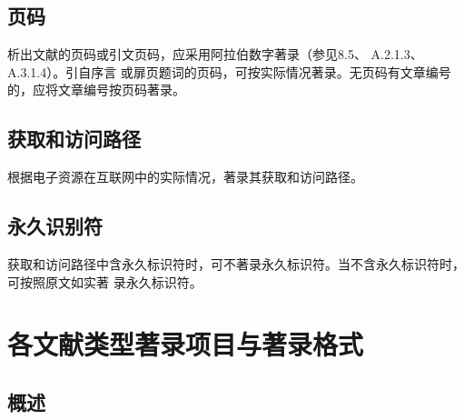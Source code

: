 \documentclass{article}
\begin{document}
\subsection{页码}
析出文献的页码或引文页码，应采用阿拉伯数字著录（参见8.5、 A.2.1.3、 A.3.1.4）。引自序言
或扉页题词的页码，可按实际情况著录。无页码有文章编号的，应将文章编号按页码著录。

\begin{refsection}
\nocite{曹凌2011-19-}
\nocite{钱学森2001--}
\nocite{冯友兰2008--}
\nocite{李约瑟1991--}
\nocite{DUBAR2013--}
\nocite{MAURYA2023}

{\printbibliography[heading=none,env=indentegenv]}
\end{refsection}


\subsection{获取和访问路径}
根据电子资源在互联网中的实际情况，著录其获取和访问路径。

\begin{refsection}

\nocite{储大同2010-721-724,weiner2010-38}

{\printbibliography[heading=none,env=indentegenv]}
\end{refsection}

\subsection{永久识别符}
获取和访问路径中含永久标识符时，可不著录永久标识符。当不含永久标识符时，可按照原文如实著
录永久标识符。

\begin{refsection}

\nocite{刘乃安2000-17-18,Deverell2013-21-22,GROSS2016LM}

{\printbibliography[heading=none,env=indentegenv]}
\end{refsection}


\titleformat{\subsubsection}[hang]{\bfseries}{\thesubsubsection}{1em}{}%
\section{各文献类型著录项目与著录格式}
\subsection{概述}
\end{document}
